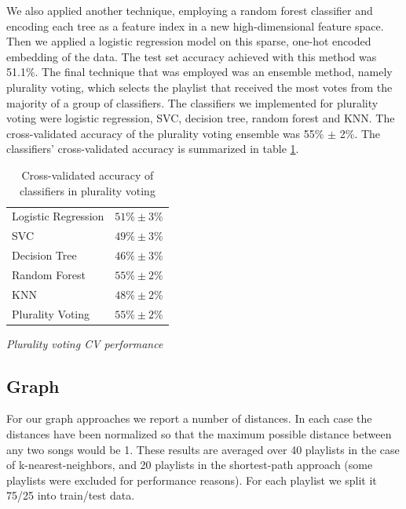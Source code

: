 \documentclass[acmtog]{acmart}
\begin{document}
\newpage

We also applied another technique, employing a random forest classifier and encoding each tree as a feature index in a new high-dimensional feature space. Then we applied a logistic regression model on this sparse, one-hot encoded embedding of the data. The test set accuracy achieved with this method was 51.1\%.
The final technique that was employed was an ensemble method, namely plurality voting, which selects the playlist that received the most votes from the majority of a group of classifiers. The classifiers we implemented for plurality voting were logistic regression, SVC, decision tree, random forest and KNN. The cross-validated accuracy of the plurality voting ensemble was 55\% $\pm$ 2\%. The classifiers' cross-validated accuracy is summarized in table \ref{tab:two}.
\begin{table}%
\caption{Cross-validated accuracy of classifiers in plurality voting}
\label{tab:two}
\begin{minipage}{\columnwidth}
\begin{center}
\begin{tabular}{ll}
  \toprule
  Logistic Regression    & $51\% \pm 3\%$\\
  SVC  & $49\% \pm 3\%$\\
  Decision Tree  & $46\% \pm 3\%$\\
  Random Forest  & $55\% \pm 2\%$\\
  KNN  & $48\% \pm 2\%$\\
  Plurality Voting  & $55\% \pm 2\%$\\
  \bottomrule
\end{tabular}
\end{center}
\bigskip\centering
\footnotesize
 \emph{Plurality voting CV performance}
\end{minipage}
\end{table}%

\subsection{Graph}

For our graph approaches we report a number of distances. In each case the distances have been normalized so that the maximum possible distance between any two songs would be 1. These results are averaged over
40 playlists in the case of k-nearest-neighbors, and 20 playlists in the shortest-path approach (some playlists were excluded for performance reasons). For each playlist we split it 75/25 into train/test data.
\end{document}
